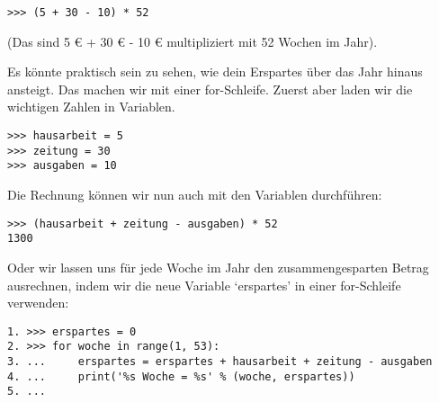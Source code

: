 \begin{Verbatim}[frame=single]
>>> (5 + 30 - 10) * 52
\end{Verbatim}

\noindent
(Das sind 5 € + 30 € - 10 € multipliziert mit 52 Wochen im Jahr).

Es könnte praktisch sein zu sehen, wie dein Erspartes über das Jahr hinaus ansteigt. Das machen wir mit einer for-Schleife. Zuerst aber laden wir die wichtigen Zahlen in Variablen.

\begin{Verbatim}[frame=single]
>>> hausarbeit = 5
>>> zeitung = 30
>>> ausgaben = 10
\end{Verbatim}

Die Rechnung können wir nun auch mit den Variablen durchführen:

\begin{Verbatim}[frame=single]
>>> (hausarbeit + zeitung - ausgaben) * 52
1300
\end{Verbatim}

Oder wir lassen uns für jede Woche im Jahr den zusammengesparten Betrag ausrechnen, indem wir die neue Variable `erspartes' in einer for-Schleife verwenden:

\begin{Verbatim}[frame=single]
1. >>> erspartes = 0
2. >>> for woche in range(1, 53):
3. ...     erspartes = erspartes + hausarbeit + zeitung - ausgaben
4. ...     print('%s Woche = %s' % (woche, erspartes))
5. ...
\end{Verbatim}

